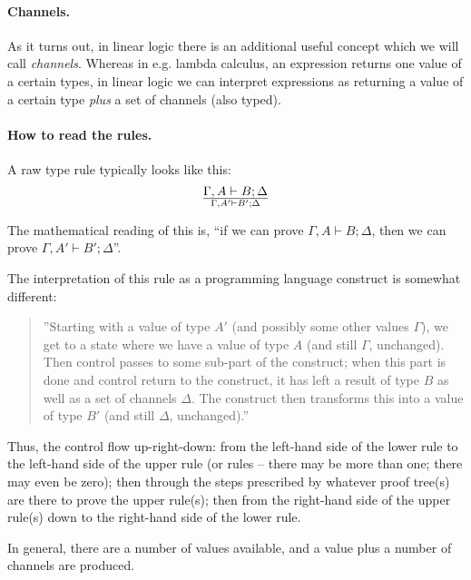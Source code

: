 \documentclass[a4paper]{article}
\begin{document}
\paragraph{Channels.} As it turns out, in linear logic there is an additional useful concept
which we will call \emph{channels}.
Whereas in e.g. lambda calculus, an expression returns one value of a
certain types, in linear logic we can interpret expressions as
returning a value of a certain type \emph{plus} a set of channels
(also typed).


\paragraph{How to read the rules.} A raw type rule typically looks like this:
$$
{\Gamma,A \vdash B;\Delta}\over{\Gamma,A' \vdash B';\Delta}
$$

The mathematical reading of this is, ``if we can prove ${\Gamma,A
  \vdash B;\Delta}$, then we can prove ${\Gamma,A' \vdash B';\Delta}$''.


The interpretation of this rule as a programming language construct is
somewhat different:
\begin{quote}
  ''Starting with a value of type $A'$ (and possibly some other values
  $\Gamma$), we get to a state where we have a value of type $A$ (and
  still $\Gamma$, unchanged). Then control passes to some sub-part of
  the construct; when this part is done and control return to the construct,
  it has left a result of type $B$ as well as a set of channels
  $\Delta$. The construct then transforms this into a value of type
  $B'$ (and still $\Delta$, unchanged).''
\end{quote}

Thus, the control flow up-right-down:
from the left-hand side of the lower rule to
the left-hand side of the upper rule (or rules -- there may be more
than one; there may even be zero); then through the steps prescribed
by whatever proof tree(s) are there to prove the upper rule(s); then
from the right-hand side of the upper rule(s) down to the right-hand
side of the lower rule.

In general, there are a number of values available, and a value plus a
number of channels are produced.
\end{document}
